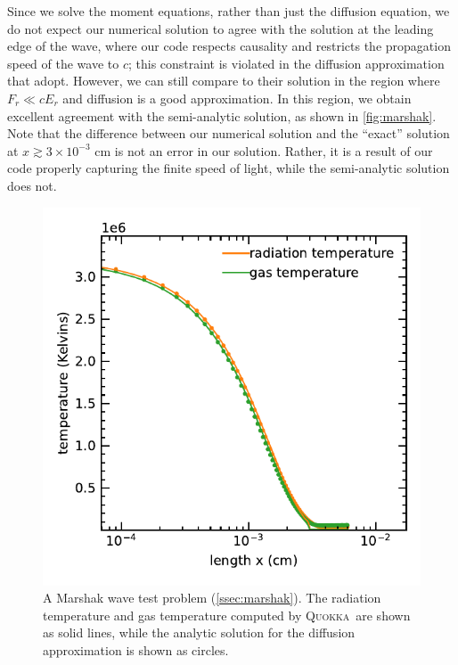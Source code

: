 \documentclass[fleqn,usenatbib]{mnras}
\newcommand{\quokka}{\textsc{Quokka}}
\begin{document}
Since we solve the moment equations, rather than just the diffusion equation, we do not expect our numerical solution to agree with the \citeauthor{Su_1996} solution at the leading edge of the wave, where our code respects causality and restricts the propagation speed of the wave to $c$; this constraint is violated in the diffusion approximation that \citeauthor{Su_1996} adopt. However, we can still compare to their solution in the region where $F_r \ll cE_r$ and diffusion is a good approximation. In this region, we obtain excellent agreement with the semi-analytic solution, as shown in \autoref{fig:marshak}. Note that the difference between our numerical solution and the ``exact'' solution at $x \gtrsim 3\times 10^{-3}$ cm is not an error in our solution. Rather, it is a result of our code properly capturing the finite speed of light, while the semi-analytic solution does not.
\begin{figure}
    \includegraphics[width=\columnwidth]{marshak_wave_cgs_gastemperature.pdf}
    \caption{A Marshak wave test problem (\autoref{ssec:marshak}). The radiation temperature and gas temperature computed by \quokka~are shown as solid lines, while the analytic solution for the diffusion approximation is shown as circles.}
    \label{fig:marshak}
\end{figure}
\end{document}
